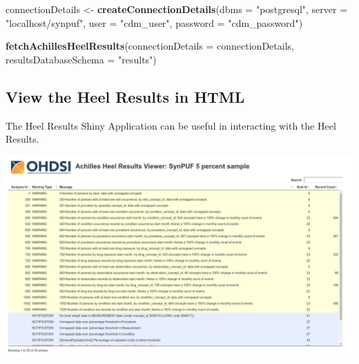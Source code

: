 \documentclass[]{article}
\newenvironment{Shaded}{\begin{snugshade}}{\end{snugshade}}
\newcommand{\KeywordTok}[1]{\textcolor[rgb]{0.13,0.29,0.53}{\textbf{#1}}}
\newcommand{\DataTypeTok}[1]{\textcolor[rgb]{0.13,0.29,0.53}{#1}}
\newcommand{\StringTok}[1]{\textcolor[rgb]{0.31,0.60,0.02}{#1}}
\newcommand{\NormalTok}[1]{#1}
\begin{document}
\begin{Shaded}
\begin{Highlighting}[]
\NormalTok{connectionDetails <-}\StringTok{ }\KeywordTok{createConnectionDetails}\NormalTok{(}\DataTypeTok{dbms =} \StringTok{"postgresql"}\NormalTok{, }
                                             \DataTypeTok{server =} \StringTok{"localhost/synpuf"}\NormalTok{, }
                                             \DataTypeTok{user =} \StringTok{"cdm_user"}\NormalTok{, }
                                             \DataTypeTok{password =} \StringTok{"cdm_password"}\NormalTok{)}

\KeywordTok{fetchAchillesHeelResults}\NormalTok{(}\DataTypeTok{connectionDetails =}\NormalTok{ connectionDetails, }
                         \DataTypeTok{resultsDatabaseSchema =} \StringTok{"results"}\NormalTok{)}
\end{Highlighting}
\end{Shaded}

\subsection{View the Heel Results in
HTML}\label{view-the-heel-results-in-html}

The Heel Results Shiny Application can be useful in interacting with the
Heel Results.

\includegraphics{../inst/doc/shinyHeel_screenshot.png}
\end{document}
